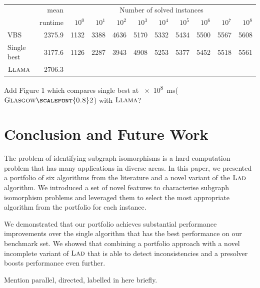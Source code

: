 \documentclass{llncs}
\newcommand{\LAD}{$\textsc{Lad}$\xspace}
\newcommand{\GlasgowTwo}{$\textsc{Glasgow{\scalefont{0.8}2}}$\xspace}
\newcommand{\LLAMA}{$\textsc{Llama}$\xspace}
\begin{document}
\begin{table}
\begin{tabular}{|l|r|rrrrrrrrr|}
&mean & \multicolumn{9}{c|}{Number of solved instances}\\
&runtime & $10^0$ &  $10^1$ &  $10^2$ &  $10^3$ &  $10^4$ &  $10^5$ &  $10^6$ &  $10^7$ &  $10^8$\\\hline
VBS & 2375.9 & 1132 & 3388 & 4636 & 5170 & 5332 & 5434 & 5500 & 5567 & 5608\\\hline
Single best & 3177.6 & 1126 & 2287 & 3943 & 4908 & 5253 & 5377 & 5452 & 5518 & 5561\\\hline
\LLAMA & 2706.3\\\hline
\end{tabular}
\caption{}\label{selectionvsvbs}
\end{table}

Add Figure 1 which compares single best at \SI{e8}{\ms}(\GlasgowTwo) with \LLAMA ?

\section{Conclusion and Future Work}\label{sec:concs}

The problem of identifying subgraph isomorphisms is a hard computation problem
that has many applications in diverse areas. In this paper, we presented a
portfolio of six algorithms from the literature and a novel variant of the \LAD
algorithm. We introduced a set of novel features to characterise subgraph
isomorphism problems and leveraged them to select the most appropriate algorithm
from the portfolio for each instance.

We demonstrated that our portfolio achieves substantial performance improvements
over the single algorithm that has the best performance on our benchmark set. We
showed that combining a portfolio approach with a novel incomplete variant of
\LAD that is able to detect inconsistencies and a presolver boosts performance
even further.

Mention parallel, directed, labelled in here briefly.



\end{document}
